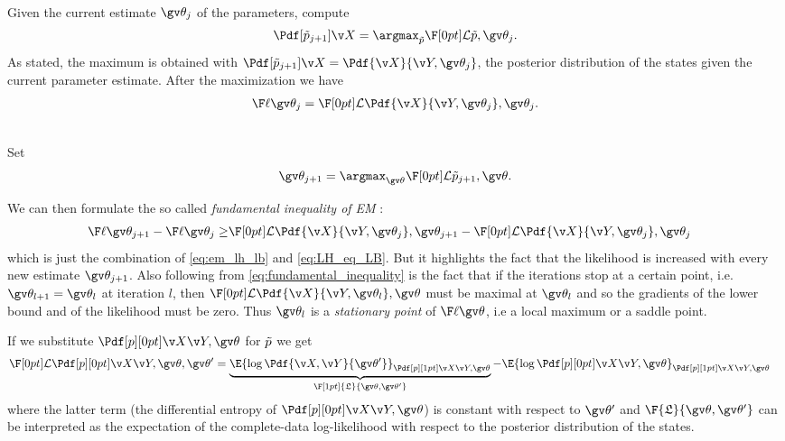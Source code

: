 \begin{description}
\addtolength{\leftskip}{1cm}
  \item[E-step]\hfill\\
  Given the current estimate $\Th_j$ of the parameters, compute	
  	\begin{align}
		\Pdf[\tP_{j+1}]{\X}=\argmax_{\tP}\LB{\tP,\Th_j}.
		\label{eq:EM_E}
	\end{align}
  As stated, the maximum is obtained with 
  $\Pdf[\tP_{j+1}]{\X} = \Pdf{\X}{\Y,\Th_j}$, the posterior
  distribution of the states given the current parameter estimate. After the maximization
  we have
  	\begin{align}
  		\lLH[\Th_j]=\LB{\Pdf{\X}{\Y,\Th_j},\Th_j}.  
		\label{eq:LH_eq_LB}
	\end{align}
  \item[M-step]\hfill\\ 
  Set
    \begin{align}
		\Th_{j+1}=\argmax_{\Th}\LB{\tP_{j+1},\Th}.
		\label{eq:EM_M}
	\end{align}
\end{description}



We can then formulate the so called \emph{fundamental inequality of EM} \parencite{Cappe2005}:
\begin{align}
	\lLH[\Th_{j+1}] - \lLH[\Th_j]\geq & \LB{\Pdf{\X}{\Y,\Th_j},\Th_{j+1}} - \LB{\Pdf{\X}{\Y,\Th_j},\Th_{j}} 
	\label{eq:fundamental_inequality}
\end{align}
which is just the combination of \eqref{eq:em_lh_lb} and \eqref{eq:LH_eq_LB}. But it highlights
the fact that the likelihood is increased with every new estimate $\Th_{j+1}$.
Also following from \eqref{eq:fundamental_inequality} is the fact that if the iterations
stop at a certain point, i.e. $\Th_{l+1}=\Th_l$ at iteration $l$, then
$\LB{\Pdf{\X}{\Y,\Th_l},\Th}$ must be maximal at $\Th_l$
and so the gradients of the lower bound and of the likelihood must be zero. Thus
$\Th_l$ is a \emph{stationary point} of $\lLH$, i.e a local maximum or a saddle point.

If we substitute $\post$ for $\tilde{p}$ we get
\begin{align}
	\LB{\post,\Th'}&=
	\underbrace{\E{\log\Pdf{\X,\Y}{\Th'}}_{\post[1pt]}}_{\F[1pt]{\Lb}{\Th,\Th'}} 
	-\E{\log\post}_{\post[1pt]}
	\label{eq:completedata_loglikelihood}
\end{align}
where the latter term (the differential entropy of $\post$) is constant 
with respect to $\Th'$ and $\F{\Lb}{\Th,\Th'}$ can be interpreted as the
expectation of the complete-data log-likelihood with respect to the posterior
distribution of the states.


